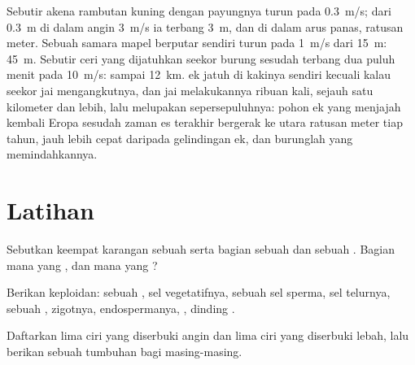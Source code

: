 \begin{example}\label{ex:b2:angiosperm-reproduction:dispersal}
Sebutir akena rambutan kuning dengan payungnya turun pada
\qty{0.3}{m/s}; dari \qty{0.3}{m} di dalam angin \qty{3}{m/s} ia
terbang \qty{3}{m}, dan di dalam arus panas, ratusan meter. Sebuah
samara mapel berputar sendiri turun pada \qty{1}{m/s} dari
\qty{15}{m}: \qty{45}{m}. Sebutir  ceri yang dijatuhkan seekor
burung sesudah terbang dua puluh menit pada \qty{10}{m/s}: sampai
\qty{12}{km}.  ek jatuh di kakinya sendiri kecuali kalau seekor
jai mengangkutnya, dan jai melakukannya ribuan kali, sejauh satu
kilometer dan lebih, lalu melupakan sepersepuluhnya: pohon ek yang
menjajah kembali Eropa sesudah zaman es terakhir bergerak ke utara
ratusan meter tiap tahun, jauh lebih cepat daripada gelindingan 
ek, dan burunglah yang memindahkannya.
\end{example}

\section{Latihan}

\begin{exercise}[$\star$]\label{exo:b2:angiosperm-reproduction:1}
Sebutkan keempat karangan sebuah  serta bagian sebuah 
dan sebuah . Bagian mana yang  , dan mana yang
 ?
\end{exercise}

\begin{exercise}[$\star$]\label{exo:b2:angiosperm-reproduction:2}
Berikan keploidan: sebuah , sel vegetatifnya, sebuah sel
sperma, sel telurnya, sebuah , zigotnya, endospermanya, , dinding .
\end{exercise}

\begin{exercise}[$\star$]\label{exo:b2:angiosperm-reproduction:3}
Daftarkan lima ciri  yang diserbuki angin dan lima ciri  yang
diserbuki lebah, lalu berikan sebuah tumbuhan bagi masing-masing.
\end{exercise}


